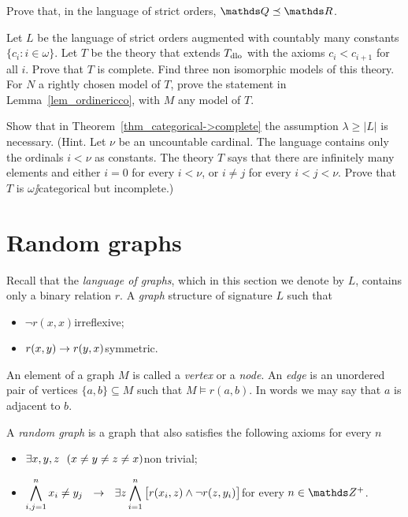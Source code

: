 \documentclass[creche.tex]{subfiles}
\begin{document}
\begin{exercise}
Prove that, in the language of strict orders, $\QQ\preceq\RR$.\QED
\end{exercise}

\begin{exercise}\label{VaughtEsempio3modelli}
Let $L$ be the language of strict orders augmented with countably many constants $\big\{c_i: i\in\omega\big\}$. Let $T$ be the theory that extends $T_{\rm dlo}$ with the axioms $c_i<c_{i+1}$ for all $i$. Prove that $T$ is complete. Find three non isomorphic models of this theory. For $N$ a rightly chosen model of $T$, prove the statement in Lemma~\ref{lem_ordinericco}, with $M$ any model of $T$.\QED
\end{exercise}


\begin{exercise}\label{categorica->completa}
Show that in Theorem~\ref{thm_categorical->complete} the assumption $\lambda\ge|L|$ is necessary. (Hint. Let $\nu$ be an uncountable cardinal. The language contains only the ordinals $i<\nu$ as constants. The theory $T$ says that there are infinitely many elements and either $i=0$ for every $i<\nu$, or $i\neq j$ for every $i<j<\nu$. Prove that $T$ is $\omega\jj$categorical but incomplete.)\QED
\end{exercise}


\section{Random graphs}
\label{randomgraph}

Recall that the \emph{language of graphs}, which in this section we denote by $L$, contains only a binary relation $r$. A \emph{graph\/} structure of signature $L$ such that

\begin{itemize}
\item[1.] $\neg r(x,x)$\hfill irreflexive;
\item[2.] $r(x,y)\rightarrow r(y,x)$\hfill symmetric.
\end{itemize}

An element of a graph $M$ is called a \emph{vertex\/} or a \emph{node}. An \emph{edge\/} is an unordered pair of vertices $\{a,b\}\subseteq M$ such that $M\models r(a,b)$. In words we may say that $a$ is adjacent to $b$.

A \emph{random graph\/} is a graph that also satisfies the following axioms for every $n$
\begin{itemize}
\item[nt.] $\exists x,y,z\ \ (x\neq y\neq z\neq x)$\hfill non trivial;
\item[r$_n$.] $\displaystyle\bigwedge^n_{i,j=1} x_i\neq y_j\ \ \rightarrow\ \ \exists z \bigwedge^n_{i=1} \big[r(x_i,z) \wedge \neg r(z,y_i)\big]$\hfill for every $n\in\ZZ^+$.
\end{itemize}
\end{document}
